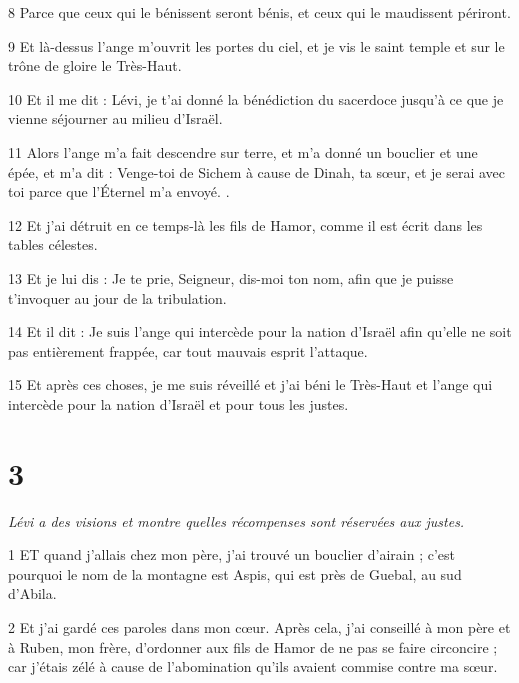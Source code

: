 \par 8 Parce que ceux qui le bénissent seront bénis, et ceux qui le maudissent périront.

\par 9 Et là-dessus l'ange m'ouvrit les portes du ciel, et je vis le saint temple et sur le trône de gloire le Très-Haut.

\par 10 Et il me dit : Lévi, je t'ai donné la bénédiction du sacerdoce jusqu'à ce que je vienne séjourner au milieu d'Israël.

\par 11 Alors l'ange m'a fait descendre sur terre, et m'a donné un bouclier et une épée, et m'a dit : Venge-toi de Sichem à cause de Dinah, ta sœur, et je serai avec toi parce que l'Éternel m'a envoyé. .

\par 12 Et j'ai détruit en ce temps-là les fils de Hamor, comme il est écrit dans les tables célestes.

\par 13 Et je lui dis : Je te prie, Seigneur, dis-moi ton nom, afin que je puisse t'invoquer au jour de la tribulation.

\par 14 Et il dit : Je suis l'ange qui intercède pour la nation d'Israël afin qu'elle ne soit pas entièrement frappée, car tout mauvais esprit l'attaque.

\par 15 Et après ces choses, je me suis réveillé et j'ai béni le Très-Haut et l'ange qui intercède pour la nation d'Israël et pour tous les justes.

\chapter{3}

\par \textit{Lévi a des visions et montre quelles récompenses sont réservées aux justes.}

\par 1 ET quand j'allais chez mon père, j'ai trouvé un bouclier d'airain ; c'est pourquoi le nom de la montagne est Aspis, qui est près de Guebal, au sud d'Abila.

\par 2 Et j'ai gardé ces paroles dans mon cœur. Après cela, j'ai conseillé à mon père et à Ruben, mon frère, d'ordonner aux fils de Hamor de ne pas se faire circoncire ; car j'étais zélé à cause de l'abomination qu'ils avaient commise contre ma sœur.

